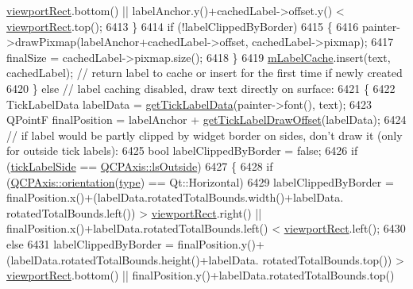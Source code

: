 \begin{DoxyCode}
      \hyperlink{class_q_c_p_axis_painter_private_a8627dc6b40781e3291bb508e4ac574d6}{viewportRect}.bottom() || labelAnchor.y()+cachedLabel->offset.y() < 
      \hyperlink{class_q_c_p_axis_painter_private_a8627dc6b40781e3291bb508e4ac574d6}{viewportRect}.top();
6413     \}
6414     \textcolor{keywordflow}{if} (!labelClippedByBorder)
6415     \{
6416       painter->drawPixmap(labelAnchor+cachedLabel->offset, cachedLabel->pixmap);
6417       finalSize = cachedLabel->pixmap.size();
6418     \}
6419     \hyperlink{class_q_c_p_axis_painter_private_a07ac270ea0c0ae084debd48d6a740e35}{mLabelCache}.insert(text, cachedLabel); \textcolor{comment}{// return label to cache or insert for the first time
       if newly created}
6420   \} \textcolor{keywordflow}{else} \textcolor{comment}{// label caching disabled, draw text directly on surface:}
6421   \{
6422     TickLabelData labelData = \hyperlink{class_q_c_p_axis_painter_private_ad9f24fbcbf9d8c92b34d9d00b010e6a3}{getTickLabelData}(painter->font(), text);
6423     QPointF finalPosition = labelAnchor + \hyperlink{class_q_c_p_axis_painter_private_a6b02e6fd70cc65f726ca8cb3e6f16de4}{getTickLabelDrawOffset}(labelData);
6424     \textcolor{comment}{// if label would be partly clipped by widget border on sides, don't draw it (only for outside tick
       labels):}
6425      \textcolor{keywordtype}{bool} labelClippedByBorder = \textcolor{keyword}{false};
6426     \textcolor{keywordflow}{if} (\hyperlink{class_q_c_p_axis_painter_private_a9d27f7625fcfbeb3a60193d0c18fc7e9}{tickLabelSide} == \hyperlink{class_q_c_p_axis_a24b13374b9b8f75f47eed2ea78c37db9a2eadb509fc0c9a8b35b85c86ec9f3c7a}{QCPAxis::lsOutside})
6427     \{
6428       \textcolor{keywordflow}{if} (\hyperlink{class_q_c_p_axis_a57483f2f60145ddc9e63f3af53959265}{QCPAxis::orientation}(\hyperlink{class_q_c_p_axis_painter_private_ae04594e97417336933d807c86d353098}{type}) == Qt::Horizontal)
6429         labelClippedByBorder = finalPosition.x()+(labelData.rotatedTotalBounds.width()+labelData.
      rotatedTotalBounds.left()) > \hyperlink{class_q_c_p_axis_painter_private_a8627dc6b40781e3291bb508e4ac574d6}{viewportRect}.right() || finalPosition.x()+labelData.rotatedTotalBounds.left()
       < \hyperlink{class_q_c_p_axis_painter_private_a8627dc6b40781e3291bb508e4ac574d6}{viewportRect}.left();
6430       \textcolor{keywordflow}{else}
6431         labelClippedByBorder = finalPosition.y()+(labelData.rotatedTotalBounds.height()+labelData.
      rotatedTotalBounds.top()) > \hyperlink{class_q_c_p_axis_painter_private_a8627dc6b40781e3291bb508e4ac574d6}{viewportRect}.bottom() || finalPosition.y()+labelData.rotatedTotalBounds.top()

\end{DoxyCode}
